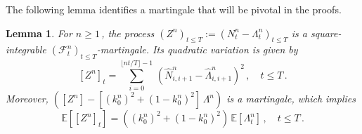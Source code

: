 \documentclass{article}
\newcommand{\1}{\mathbbm{1}}
\newtheorem{lemma}[theorem]{Lemma}
\numberwithin{equation}{section}
\begin{document}
The following lemma identifies a martingale that will be pivotal in the proofs.
\begin{lemma}
    \label{lemma:martingales}
    For $n \geq 1\,$, the process $\left(Z^n\right)_{t \leq T} := \left(N^n_t - \Lambda^n_t\right)_{t \leq T}$ is a square-integrable $\left(\mathcal F^n_t\right)_{t \leq T}$-martingale. Its quadratic variation is given by
    $$
    \left[ Z^n\right]_t = \sum_{i = 0}^{\lfloor nt/T\rfloor - 1}\,\left( \widehat N^n_{i,i+1} - \widehat \Lambda^n_{i,i+1}\right)^2\,, \quad t \leq T\,.
    $$
    Moreover, $\left([Z^n] - \left[\left(k_0^n\right)^2 + \left(1 - k_0^n\right)^2\right]\, \Lambda^n\right)$ is a martingale, which implies
    \begin{equation}
        \label{eq:exp_quadratic_var_Z}
        \mathbb E \left[\left[Z^n\right]_t \right] = \left(\left(k_0^n\right)^2 + \left(1 - k_0^n\right)^2\right)\, \mathbb E \left[ \Lambda^n_t\right]\,, \quad t \leq T\,.
    \end{equation}
\end{lemma}
\end{document}
